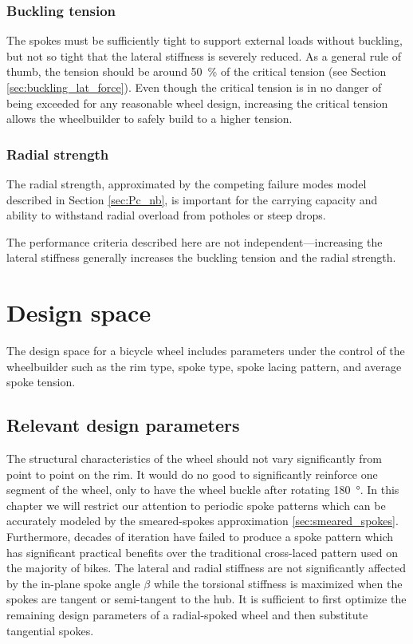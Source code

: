 \documentclass[\rootdir/thesis.tex]{subfiles}
\begin{document}
\subsubsection*{Buckling tension}
The spokes must be sufficiently tight to support external loads without buckling, but not so tight that the lateral stiffness is severely reduced. As a general rule of thumb, the tension should be around \SI{50}{\percent} of the critical tension (see Section \ref{sec:buckling_lat_force}). Even though the critical tension is in no danger of being exceeded for any reasonable wheel design, increasing the critical tension allows the wheelbuilder to safely build to a higher tension.

\subsubsection*{Radial strength}
The radial strength, approximated by the competing failure modes model described in Section \ref{sec:Pc_nb}, is important for the carrying capacity and ability to withstand radial overload from potholes or steep drops.

The performance criteria described here are not independent---increasing the lateral stiffness generally increases the buckling tension and the radial strength.


\section{Design space}

The design space for a bicycle wheel includes parameters under the control of the wheelbuilder such as the rim type, spoke type, spoke lacing pattern, and average spoke tension.

\subsection{Relevant design parameters}


The structural characteristics of the wheel should not vary significantly from point to point on the rim. It would do no good to significantly reinforce one segment of the wheel, only to have the wheel buckle after rotating \SI{180}{\degree}. In this chapter we will restrict our attention to periodic spoke patterns which can be accurately modeled by the smeared-spokes approximation \ref{sec:smeared_spokes}. Furthermore, decades of iteration have failed to produce a spoke pattern which has significant practical benefits over the traditional cross-laced pattern used on the majority of bikes. The lateral and radial stiffness are not significantly affected by the in-plane spoke angle $\beta$ while the torsional stiffness is maximized when the spokes are tangent or semi-tangent to the hub. It is sufficient to first optimize the remaining design parameters of a radial-spoked wheel and then substitute tangential spokes.
\end{document}
